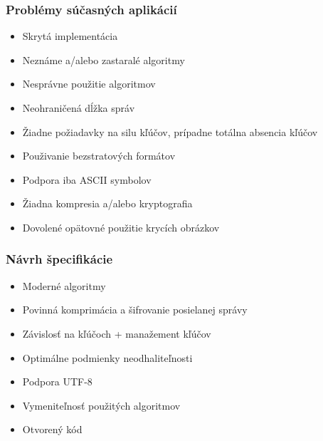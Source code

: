 \documentclass{beamer}
\begin{document}
\begin{frame}
    \frametitle{Problémy súčasných aplikácií}
    \begin{itemize}
        \item Skrytá implementácia
        \item Neznáme a/alebo zastaralé algoritmy
        \item Nesprávne použitie algoritmov
        \item Neohraničená dĺžka správ
        \item Žiadne požiadavky na silu kľúčov, prípadne totálna absencia kľúčov
        \item Použivanie bezstratových formátov
        \item Podpora iba ASCII symbolov
        \item Žiadna kompresia a/alebo kryptografia
        \item Dovolené opätovné použitie krycích obrázkov
    \end{itemize}
\end{frame}

\begin{frame}
    \frametitle{Návrh špecifikácie}
    \begin{itemize}
        \item Moderné algoritmy
        \item Povinná komprimácia a šifrovanie posielanej správy
        \item Závislosť na kľúčoch + manažement kľúčov
        \item Optimálne podmienky neodhaliteľnosti
        \item Podpora UTF-8
        \item Vymeniteľnosť použitých algoritmov
        \item Otvorený kód
    \end{itemize}
    
\end{frame}
\end{document}
